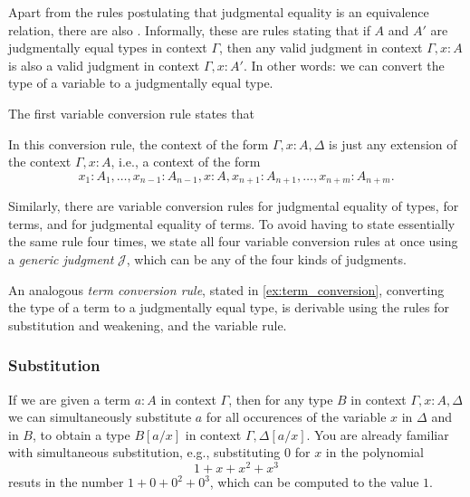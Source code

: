 \bigskip
Apart from the rules postulating that judgmental equality is an equivalence relation, there are also .
Informally, these are rules stating that if $A$ and $A'$ are judgmentally equal types in context $\Gamma$, then any valid judgment in context $\Gamma,x:A$ is also a valid judgment in context $\Gamma,x:A'$. In other words: we can convert the type of a variable to a judgmentally equal type.

The first variable conversion rule states that
\begin{prooftree}
\end{prooftree}
In this conversion rule, the context of the form $\Gamma,x:A,\Delta$ is just any extension of the context $\Gamma,x:A$, i.e., a context of the form
\begin{equation*}
  x_1:A_1,\ldots,x_{n-1}:A_{n-1},x:A,x_{n+1}:A_{n+1},\ldots,x_{n+m}:A_{n+m}.
\end{equation*}

Similarly, there are variable conversion rules for judgmental equality of types, for terms, and for judgmental equality of terms. To avoid having to state essentially the same rule four times, we state all four variable conversion rules at once using a \emph{generic judgment} $\mathcal{J}$, which can be any of the four kinds of judgments.
\begin{prooftree}
\end{prooftree}
An analogous \emph{term conversion rule}, stated in \cref{ex:term_conversion}, converting the type of a term to a judgmentally equal type, is derivable using the rules for substitution and weakening, and the variable rule.

\subsubsection*{Substitution}
If we are given a term $a:A$ in context $\Gamma$, then for any type $B$ in context $\Gamma,x:A,\Delta$ we can simultaneously substitute $a$ for all occurences of the variable $x$ in $\Delta$ and in $B$, to obtain a type $B[a/x]$ in context $\Gamma,\Delta[a/x]$. You are already familiar with simultaneous substitution, e.g., substituting $0$ for $x$ in the polynomial
\begin{equation*}
  1+x+x^2+x^3
\end{equation*}
resuts in the number $1+0+0^2+0^3$, which can be computed to the value $1$. 

